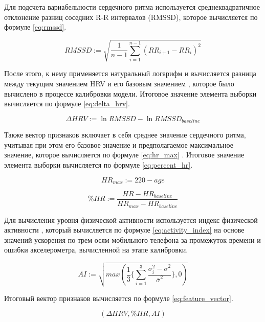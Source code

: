 \documentclass[14pt]{matmex-diploma-custom}
\begin{document}
Для подсчета вариабельности сердечного ритма используется среднеквадратичное
отклонение разниц соседних R-R интервалов (RMSSD), которое вычисляется по
формуле \ref{eq:rmssd}.

\begin{equation} \label{eq:rmssd}
  RMSSD := \sqrt{\frac{1}{n-1}\sum_{i=1}^{n-1}(RR_{i+1} - RR_{i})^2}
\end{equation}

После этого, к нему применяется натуральный логарифм \cite{article:ln_rmssd} и
вычисляется разница между текущим значением HRV и его базовым значением
\cite{article:delta_reliability}, которое было вычислено в процессе калибровки
модели. Итоговое значение элемента выборки вычисляется по формуле
\ref{eq:delta_hrv}.

\begin{equation} \label{eq:delta_hrv}
  {\Delta}HRV := \ln{RMSSD} - \ln{RMSSD_{baseline}}
\end{equation}

Также вектор признаков включает в себя среднее значение сердечного ритма,
учитывая при этом его базовое значение и предполагаемое максимальное значение,
которое вычисляется по формуле \ref{eq:hr_max} \cite{article:age_adjusted_hr}.
Итоговое значение элемента выборки вычисляется по формуле \ref{eq:percent_hr}.

\begin{equation} \label{eq:hr_max}
  HR_{max} := 220 - age
\end{equation}

\begin{equation} \label{eq:percent_hr}
  \%HR := \frac{HR - HR_{baseline}}{HR_{max} - HR_{baseline}}
\end{equation}

Для вычисления уровня физической активности используется индекс физической
активности \cite{article:activity_index}, который вычисляется по формуле
\ref{eq:activity_index} на основе значений ускорения по трем осям мобильного
телефона за промежуток времени и ошибки акселерометра, вычисленной на этапе
калибровки.

\begin{equation} \label{eq:activity_index}
  AI := \sqrt{max(\frac{1}{3}\{\sum_{i=1}^3\frac{\sigma_i^2 - \overline{\sigma}^2}{\overline{\sigma}^2}\}, 0)}
\end{equation}

Итоговый вектор признаков вычисляется по формуле \ref{eq:feature_vector}.

\begin{equation} \label{eq:feature_vector}
  ({\Delta}HRV, \%HR, AI)
\end{equation}
\end{document}
